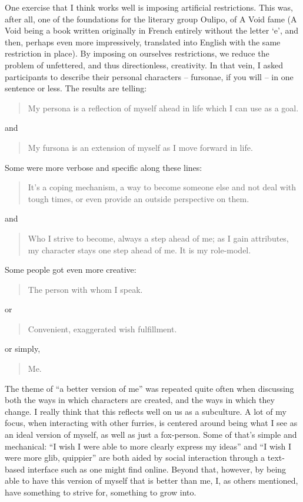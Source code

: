 One exercise that I think works well is imposing artificial restrictions. This was, after all, one of the foundations for the literary group Oulipo, of A Void fame (A Void being a book written originally in French entirely without the letter `e', and then, perhaps even more impressively, translated into English with the same restriction in place). By imposing on ourselves restrictions, we reduce the problem of unfettered, and thus directionless, creativity. In that vein, I asked participants to describe their personal characters -- fursonae, if you will -- in one sentence or less. The results are telling:

\begin{quote}
  My persona is a reflection of myself ahead in life which I can use as a goal.
\end{quote}

and

\begin{quote}
  My fursona is an extension of myself as I move forward in life.
\end{quote}

Some were more verbose and specific along these lines:

\begin{quote}
  It's a coping mechanism, a way to become someone else and not deal with tough times, or even provide an outside perspective on them.
\end{quote}

and

\begin{quote}
  Who I strive to become, always a step ahead of me; as I gain attributes, my character stays one step ahead of me. It is my role-model.
\end{quote}

Some people got even more creative:

\begin{quote}
  The person with whom I speak.
\end{quote}

or

\begin{quote}
  Convenient, exaggerated wish fulfillment.
\end{quote}

or simply,

\begin{quote}
  Me.
\end{quote}

The theme of ``a better version of me'' was repeated quite often when discussing both the ways in which characters are created, and the ways in which they change. I really think that this reflects well on us as a subculture. A lot of my focus, when interacting with other furries, is centered around being what I see as an ideal version of myself, as well as just a fox-person. Some of that's simple and mechanical: ``I wish I were able to more clearly express my ideas'' and ``I wish I were more glib, quippier'' are both aided by social interaction through a text-based interface such as one might find online. Beyond that, however, by being able to have this version of myself that is better than me, I, as others mentioned, have something to strive for, something to grow into.

